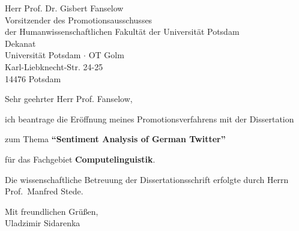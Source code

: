 \documentclass[12pt]{dinbrief}
\newcommand{\sgdh}{Sehr geehrter Herr Prof. Fanselow}
\newcommand{\wowa}{Uladzimir Sidarenka}
\begin{document}
\begin{letter}
  {
    Herr Prof. Dr. Gisbert Fanselow\\
    Vorsitzender des Promotionsausschusses\\
    der Humanwissenschaftlichen Fakult\"at der Universit\"at Potsdam\\
    Dekanat\\
    Universit\"at Potsdam $\cdot$ OT Golm\\
    Karl-Liebknecht-Str. 24-25\\
    14476 Potsdam
  }

    \addresshigh
    \nowindowrules %
    \nobackaddressrule %

    \date{\today}
    \subject{\textbf{Antrag auf Er\"offnung meines Promotionsverfahrens}}
    \opening{\sgdh,}

    ich beantrage die Er\"offnung meines Promotionsverfahrens mit der
    Dissertation

    zum Thema \textbf{``Sentiment Analysis of German Twitter''}

    f\"ur das Fachgebiet \textbf{Computelinguistik}.

    Die wissenschaftliche Betreuung der Dissertationsschrift erfolgte
    durch Herrn Prof.~Manfred Stede.

    \bigskip
    \closing{Mit freundlichen Gr\"u\ss{}en,\\ \wowa}
\end{letter}
\end{document}

